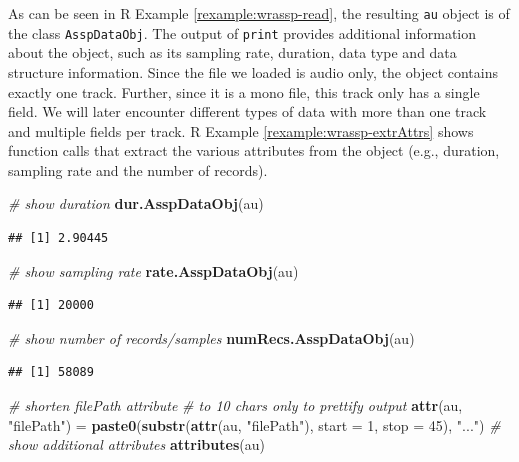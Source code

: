 \documentclass[]{book}
\newenvironment{Shaded}{\begin{snugshade}}{\end{snugshade}}
\newcommand{\CommentTok}[1]{\textcolor[rgb]{0.56,0.35,0.01}{\textit{#1}}}
\newcommand{\DataTypeTok}[1]{\textcolor[rgb]{0.13,0.29,0.53}{#1}}
\newcommand{\DecValTok}[1]{\textcolor[rgb]{0.00,0.00,0.81}{#1}}
\newcommand{\KeywordTok}[1]{\textcolor[rgb]{0.13,0.29,0.53}{\textbf{#1}}}
\newcommand{\NormalTok}[1]{#1}
\newcommand{\StringTok}[1]{\textcolor[rgb]{0.31,0.60,0.02}{#1}}
\theoremstyle{definition}
\theoremstyle{definition}
\theoremstyle{definition}
\theoremstyle{remark}
\begin{document}
As can be seen in R Example \ref{rexample:wrassp-read}, the resulting
\texttt{au} object is of the class \texttt{AsspDataObj}. The output of
\texttt{print} provides additional information about the object, such as
its sampling rate, duration, data type and data structure information.
Since the file we loaded is audio only, the object contains exactly one
track. Further, since it is a mono file, this track only has a single
field. We will later encounter different types of data with more than
one track and multiple fields per track. R Example
\ref{rexample:wrassp-extrAttrs} shows function calls that extract the
various attributes from the object (e.g., duration, sampling rate and
the number of records).

\begin{Shaded}
\begin{Highlighting}[]
\CommentTok{# show duration}
\KeywordTok{dur.AsspDataObj}\NormalTok{(au)}
\end{Highlighting}
\end{Shaded}

\begin{verbatim}
## [1] 2.90445
\end{verbatim}

\begin{Shaded}
\begin{Highlighting}[]
\CommentTok{# show sampling rate}
\KeywordTok{rate.AsspDataObj}\NormalTok{(au)}
\end{Highlighting}
\end{Shaded}

\begin{verbatim}
## [1] 20000
\end{verbatim}

\begin{Shaded}
\begin{Highlighting}[]
\CommentTok{# show number of records/samples}
\KeywordTok{numRecs.AsspDataObj}\NormalTok{(au)}
\end{Highlighting}
\end{Shaded}

\begin{verbatim}
## [1] 58089
\end{verbatim}

\begin{Shaded}
\begin{Highlighting}[]
\CommentTok{# shorten filePath attribute}
\CommentTok{# to 10 chars only to prettify output}
\KeywordTok{attr}\NormalTok{(au, }\StringTok{"filePath"}\NormalTok{)  =}\StringTok{ }\KeywordTok{paste0}\NormalTok{(}\KeywordTok{substr}\NormalTok{(}\KeywordTok{attr}\NormalTok{(au, }\StringTok{"filePath"}\NormalTok{),}
                                      \DataTypeTok{start =} \DecValTok{1}\NormalTok{,}
                                      \DataTypeTok{stop =} \DecValTok{45}\NormalTok{), }\StringTok{"..."}\NormalTok{)}
\CommentTok{# show additional attributes}
\KeywordTok{attributes}\NormalTok{(au)}
\end{Highlighting}
\end{Shaded}
\end{document}
